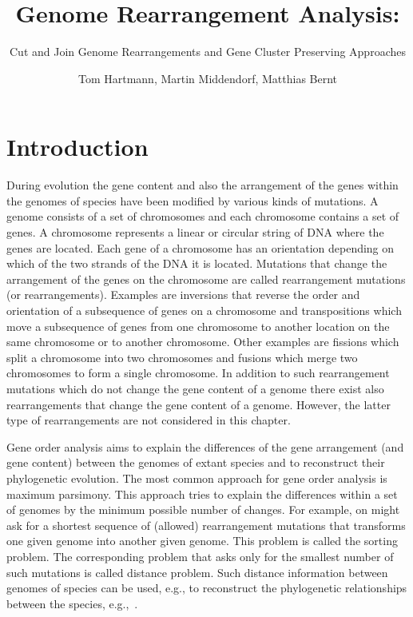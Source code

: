 \documentclass{svmult}
\begin{document}
\title*{Genome Rearrangement Analysis:}
\subtitle{Cut and Join Genome Rearrangements and Gene Cluster Preserving Approaches}
\author{Tom Hartmann, Martin Middendorf, Matthias Bernt}
 

\maketitle



\section{Introduction}

During evolution the gene content and also the arrangement of the genes within the genomes of species 
have been modified by various kinds of mutations. 
A genome consists of a set of chromosomes and each chromosome contains a set of genes. A chromosome represents 
a linear or circular string of DNA where the genes are located. Each gene of a chromosome has an orientation 
depending on which of the two strands of the DNA it is located. 
Mutations that change the arrangement of the genes on the
chromosome are called rearrangement mutations (or rearrangements). Examples are inversions that reverse the order and orientation 
of a subsequence of genes on a chromosome and transpositions 
which move a subsequence of genes from one chromosome to another location on the same chromosome or to another chromosome.
Other examples are fissions which split a chromosome into two chromosomes and fusions which merge two chromosomes to form a 
single chromosome. In addition to such rearrangement mutations which do not change the gene content of a genome there exist also 
rearrangements that change the gene content of a genome. However,
the latter type of rearrangements are not considered in this chapter.

Gene order analysis aims to explain the differences of the gene arrangement (and gene content) between the genomes of extant species 
and to reconstruct their phylogenetic evolution. The most common approach for
gene order analysis is maximum parsimony. This approach tries to explain the differences within a set of genomes by the minimum
possible number of changes. For example, on might ask for a shortest sequence of (allowed) rearrangement mutations that transforms one given genome into another given genome. This problem is called the sorting problem. The corresponding problem that asks only for the smallest number of such mutations is called distance problem. 
Such distance information between genomes of species can be used, e.g., to reconstruct the phylogenetic relationships between the species, 
e.g.,~\cite{Wang_2006}.
\end{document}
